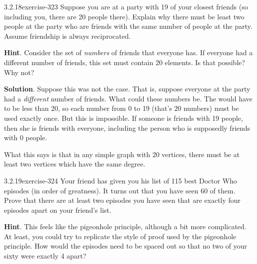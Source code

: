 \documentclass[twoside,11pt,]{book}
\numberwithin{equation}{chapter}
\begin{document}
\begin{divisionsolution}{3.2.18}{}{exercise-323}%
\hypertarget{p-4199}{}%
Suppose you are at a party with 19 of your closest friends (so including you, there are 20 people there). Explain why there must be least two people at the party who are friends with the same number of people at the party. Assume friendship is always reciprocated.%
\par\smallskip%
\noindent\textbf{Hint}.\quad%
\hypertarget{p-4200}{}%
Consider the set of \emph{numbers} of friends that everyone has.  If everyone had a different number of friends, this set must contain 20 elements.  Is that possible?  Why not?%
\par\smallskip%
\noindent\textbf{Solution}.\quad%
\hypertarget{p-4201}{}%
Suppose this was not the case. That is, suppose everyone at the party had a \emph{different} number of friends. What could these numbers be. The would have to be less than 20, so each number from 0 to 19 (that's 20 numbers) must be used exactly once. But this is impossible. If someone is friends with 19 people, then she is friends with everyone, including the person who is supposedly friends with 0 people.%
\par
\hypertarget{p-4202}{}%
What this says is that in any simple graph with 20 vertices, there must be at least two vertices which have the same degree.%
\end{divisionsolution}%
\begin{divisionsolution}{3.2.19}{}{exercise-324}%
\hypertarget{p-4203}{}%
Your friend has given you his list of 115 best Doctor Who episodes (in order of greatness). It turns out that you have seen 60 of them. Prove that there are at least two episodes you have seen that are exactly four episodes apart on your friend's list.%
\par\smallskip%
\noindent\textbf{Hint}.\quad%
\hypertarget{p-4204}{}%
This feels like the pigeonhole principle, although a bit more complicated.  At least, you could try to replicate the style of proof used by the pigeonhole principle.  How would the episodes need to be spaced out so that no two of your sixty were exactly 4 apart?%
\end{divisionsolution}%
\end{document}
